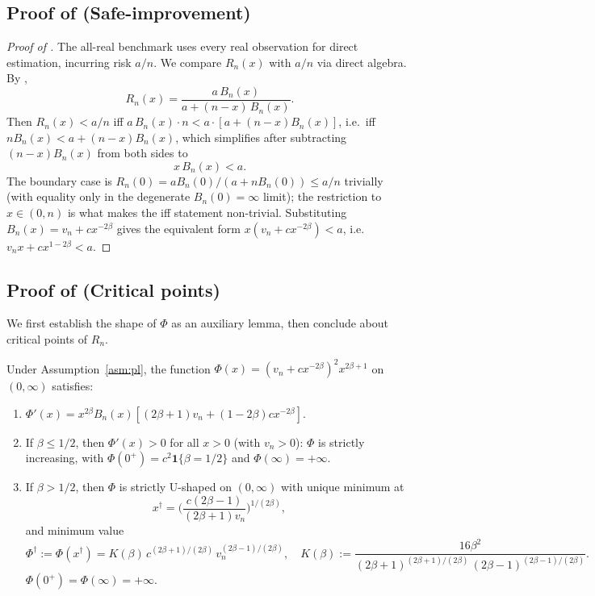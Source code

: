 \subsection{Proof of \texorpdfstring{}{Proposition~\ref{prop:safe}} (Safe-improvement)}\label{proof:safe}

\begin{proof}[Proof of ]
The all-real benchmark uses every real observation for direct estimation, incurring risk $a/n$. We compare $R_n(x)$ with $a/n$ via direct algebra. By ,
\[
R_n(x) = \frac{a\, B_n(x)}{a + (n-x)\, B_n(x)}.
\]
Then $R_n(x) < a/n$ iff $a\, B_n(x) \cdot n < a \cdot [a + (n-x) B_n(x)]$, i.e.\ iff $n B_n(x) < a + (n-x) B_n(x)$, which simplifies after subtracting $(n-x) B_n(x)$ from both sides to
\[
x\, B_n(x) < a.
\]
The boundary case is $R_n(0) = a B_n(0)/(a + n B_n(0)) \le a/n$ trivially (with equality only in the degenerate $B_n(0) = \infty$ limit); the restriction to $x \in (0, n)$ is what makes the iff statement non-trivial. Substituting $B_n(x) = v_n + c x^{-2\beta}$ gives the equivalent form $x(v_n + c x^{-2\beta}) < a$, i.e.\ $v_n x + c x^{1-2\beta} < a$.
\end{proof}

\subsection{Proof of \texorpdfstring{}{Lemma~\ref{lem:critical}} (Critical points)}\label{proof:critical}

We first establish the shape of $\Phi$ as an auxiliary lemma, then conclude about critical points of $R_n$.

\begin{lemma}\label{lem:shape}
Under Assumption~\ref{asm:pl}, the function $\Phi(x) = (v_n + c x^{-2\beta})^2 x^{2\beta+1}$ on $(0,\infty)$ satisfies:
\begin{enumerate}[label=\rm(\alph*),leftmargin=*]
\item $\Phi'(x) = x^{2\beta} B_n(x) [(2\beta+1) v_n + (1-2\beta) c x^{-2\beta}]$.
\item If $\beta \le 1/2$, then $\Phi'(x) > 0$ for all $x > 0$ (with $v_n > 0$): $\Phi$ is strictly increasing, with $\Phi(0^+) = c^2 \mathbf{1}\{\beta = 1/2\}$ and $\Phi(\infty) = +\infty$.
\item If $\beta > 1/2$, then $\Phi$ is strictly U-shaped on $(0,\infty)$ with unique minimum at
\begin{equation}\label{eq:xdagger-app}
x^\dagger = \biggl(\frac{c(2\beta-1)}{(2\beta+1)v_n}\biggr)^{1/(2\beta)},
\end{equation}
and minimum value
\begin{equation}\label{eq:Phidagger-app}
\Phi^\dagger := \Phi(x^\dagger)
= K(\beta)\, c^{(2\beta+1)/(2\beta)}\, v_n^{(2\beta-1)/(2\beta)},
\quad
K(\beta) := \frac{16 \beta^2}{(2\beta+1)^{(2\beta+1)/(2\beta)}\,
                              (2\beta-1)^{(2\beta-1)/(2\beta)}}.
\end{equation}
$\Phi(0^+) = \Phi(\infty) = +\infty$.
\end{enumerate}
\end{lemma}

